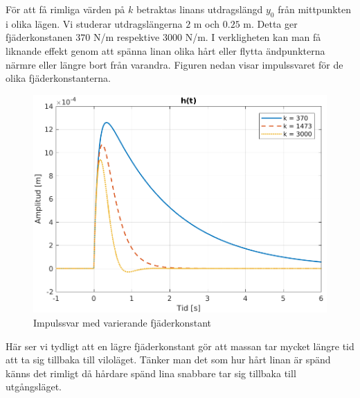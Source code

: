 \newpage
För att få rimliga värden på $k$ betraktas linans utdragslängd $y_0$ från mittpunkten i olika lägen. Vi studerar utdragslängerna $2$ m och $0.25$ m. Detta ger fjäderkonstanen $370$ N/m respektive $3000$ N/m. I verkligheten kan man få liknande effekt genom att spänna linan olika hårt eller flytta ändpunkterna närmre eller längre bort från varandra. Figuren nedan visar impulssvaret för de olika fjäderkonstanterna.
\begin{figure}[H] 
    \centering
    \includegraphics[scale=0.9]{bilder/impulssvar_variation_k}
    \caption{Impulssvar med varierande fjäderkonstant}
    \label{fig:impulssvar_variation_k}
\end{figure}
Här ser vi tydligt att en lägre fjäderkonstant gör att massan tar mycket längre tid att ta sig tillbaka till viloläget. Tänker man det som hur hårt linan är spänd känns det rimligt då hårdare spänd lina snabbare tar sig tillbaka till utgångsläget. 

